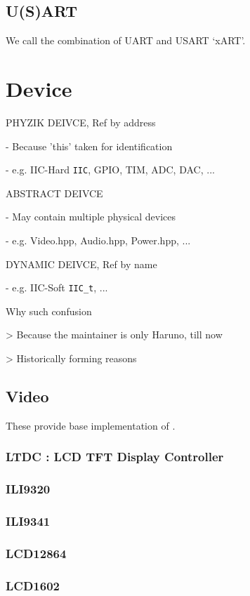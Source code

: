 \subsection{U(S)ART}

We call the combination of UART and USART `xART'. 

\section{Device}

PHYZIK DEIVCE, Ref by address

- Because 'this' taken for identification

- e.g. IIC-Hard \verb`IIC`, GPIO, TIM, ADC, DAC, ...

ABSTRACT DEIVCE

- May contain multiple physical devices

- e.g. Video.hpp, Audio.hpp, Power.hpp, ...

DYNAMIC DEIVCE, Ref by name

- e.g. IIC-Soft \verb`IIC_t`, ...

Why such confusion

> Because the maintainer is only Haruno, till now

> Historically forming reasons

\subsection{Video}

These provide base implementation of .

\subsubsection{LTDC : LCD TFT Display Controller}

\subsubsection{ILI9320}
\subsubsection{ILI9341}
\subsubsection{LCD12864}
\subsubsection{LCD1602}


